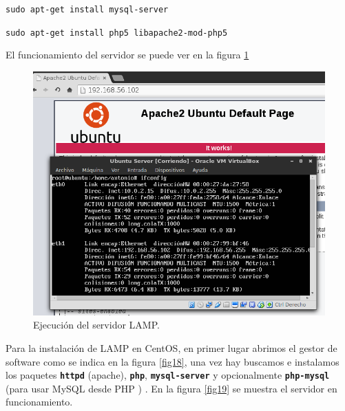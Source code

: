 \hskip3.5cm \texttt{sudo apt-get install mysql-server }

\hskip3.5cm \texttt{sudo apt-get install php5 libapache2-mod-php5}

El funcionamiento del servidor se puede ver en la figura \ref{fig17}

\begin{figure}[H]
    \begin{center}
        \includegraphics[scale=0.6]{imagenes/img17}
        \caption{Ejecución del servidor LAMP.}
        \label{fig17}
    \end{center}
\end{figure}

Para la instalación de LAMP en CentOS, en primer lugar abrimos el gestor de software como se indica en la figura \ref{fig18}, una vez hay buscamos e instalamos los paquetes \textbf{\texttt{httpd}} (apache), \textbf{\texttt{php}}, \textbf{\texttt{mysql-server}} y opcionalmente \textbf{\texttt{php-mysql}} (para usar MySQL desde PHP ) \cite{l4}. En la figura \ref{fig19} se muestra el servidor en funcionamiento.

